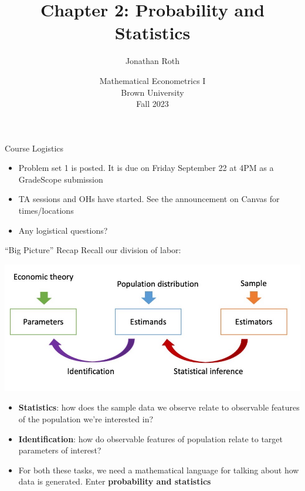 \documentclass[11pt,english,handout]{beamer}
\begin{document}
\begin{frame}[noframenumbering]{}
\vspace{0.5cm}
\title[]{Chapter 2: Probability and Statistics}
\author{Jonathan Roth}
\date{Mathematical Econometrics I \\ Brown University \\ Fall 2023} 
\titlepage {\small{}\ }\thispagestyle{empty} \vspace{-30pt}

\end{frame}
 
\begin{frame}{Course Logistics}

\begin{itemize}
\item
Problem set 1 is posted. It is due on Friday September 22 at 4PM as a GradeScope submission
\bigskip

\item
TA sessions and OHs have started. See the announcement on Canvas for times/locations
\bigskip

\item
Any logistical questions?
\end{itemize}	
\end{frame}



\begin{frame}{``Big Picture'' Recap}
\vspace{0.1cm}
Recall our division of labor:
\begin{center}
\includegraphics[width=0.9\linewidth]{BigPicture.jpg}
\end{center}
\vspace{-0.2cm}

\begin{itemize}
\item
\textbf{Statistics}: how does the sample data we observe relate to observable features of the population we're interested in? 
\smallskip

\item
\textbf{Identification}: how do observable features of population relate to target parameters of interest? 
\smallskip
\pause{}

\item
For both these tasks, we need a mathematical language for talking about how data is generated. Enter \textbf{probability and statistics}


\end{itemize}

\end{frame}
\end{document}

